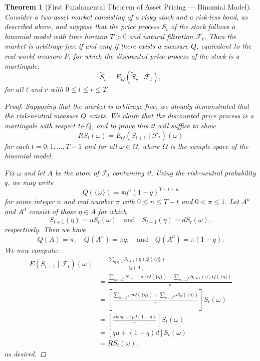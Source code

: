\documentclass[11pt, openany, oneside]{book}
\newtheorem{thm}{Theorem}[section]
\theoremstyle{definition}
\theoremstyle{remark}
\theoremstyle{boldital}
\numberwithin{equation}{section}
\begin{document}
\begin{thm}[First Fundamental Theorem of Asset Pricing --- Binomial Model]\label{thm:FTAP1-binomial}
Consider a two-asset market consisting of a risky stock and a risk-less bond, as described above, and suppose that the price process $S_t$ of the stock follows a binomial model with time horizon $T>0$ and natural filtration $\mathcal{F}_t$. Then the market is arbitrage-free if and only if there exists a measure $Q$, equivalent to the real-world measure $P$, for which the discounted price process of the stock is a martingale:
	\[
	\tilde{S}_t = E_Q ( \tilde{S}_r\mid \mathcal{F}_t),
	\]
for all $t$ and $r$ with $0 \leq t \leq r\leq T$.
\begin{proof}
Supposing that the market is arbitrage free, we already demonstrated that the risk-neutral measure $Q$ exists. We claim that the discounted price process is a martingale with respect to $Q$, and to prove this it will suffice to show
	\[
	RS_t(\omega) = E_Q\left(S_{t+1} \mid \mathcal{F}_t \right)(\omega)
	\]
for each $t=0,1,\ldots,T-1$ and for all $\omega\in \Omega$, where $\Omega$ is the sample space of the binomial model.

Fix $\omega$ and let $A$ be the atom of $\mathcal{F}_t$ containing it. Using the risk-neutral probability $q$, we may write
	\[
	Q(\{\omega\}) = \pi q^n (1-q)^{T-t-n}
	\]
for some integer $n$ and real number $\pi$ with $0\leq n \leq T-t$ and $0 < \pi \leq 1$. Let $A^u$ and $A^d$ consist of those $\eta \in A$ for which
	\[S_{t+1}(\eta) = uS_t(\omega) \quad \text{and} \quad S_{t+1}(\eta) = d S_t(\omega),
	\]
respectively. Then we have
	\[
	Q(A) = \pi, \quad Q(A^u) = \pi q, \quad \text{and} \quad Q(A^d) = \pi (1-q).
	\]
We now compute:
	\begin{align*}
	E\left(S_{t+1} \mid \mathcal{F}_t \right)(\omega) &= \frac{\sum_{\eta\in A} S_{t+1}(\eta)Q(\{\eta\})}{Q(A)} \\
	&= \frac{\sum_{\eta\in A^u} S_{t+1}(\eta)Q(\{\eta\}) + \sum_{\eta\in A^d} S_{t+1}(\eta)Q(\{\eta\})}{\pi} \\
	&= \left[ \frac{\sum_{\eta\in A^u} uQ(\{\eta\}) + \sum_{\eta\in A^d} dQ(\{\eta\})}{\pi} \right]S_t(\omega) \\
	&= \left[ \frac{\pi puq + \pi pd(1-q)}{\pi} \right]S_t(\omega) \\
	&= \left[ qu + (1-q)d\right]S_t(\omega) \\
	&= R S_t(\omega),
	\end{align*}
as desired.


\end{proof}
\end{thm}
\end{document}
